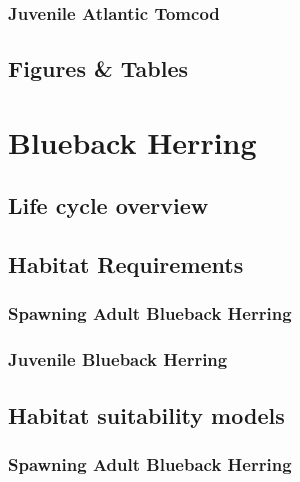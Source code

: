 \documentclass[
]{book}
\begin{document}
\hypertarget{juvenile-atlantic-tomcod-1}{%
\subsection{Juvenile Atlantic Tomcod}\label{juvenile-atlantic-tomcod-1}}

\hypertarget{figures-tables-5}{%
\section{Figures \& Tables}\label{figures-tables-5}}

\hypertarget{blueback-herring}{%
\chapter{Blueback Herring}\label{blueback-herring}}

\hypertarget{life-cycle-overview-6}{%
\section{Life cycle overview}\label{life-cycle-overview-6}}

\hypertarget{habitat-requirements-6}{%
\section{Habitat Requirements}\label{habitat-requirements-6}}

\hypertarget{spawning-adult-blueback-herring}{%
\subsection{Spawning Adult Blueback Herring}\label{spawning-adult-blueback-herring}}

\hypertarget{juvenile-blueback-herring}{%
\subsection{Juvenile Blueback Herring}\label{juvenile-blueback-herring}}

\hypertarget{habitat-suitability-models-6}{%
\section{Habitat suitability models}\label{habitat-suitability-models-6}}

\hypertarget{spawning-adult-blueback-herring-1}{%
\subsection{Spawning Adult Blueback Herring}\label{spawning-adult-blueback-herring-1}}
\end{document}
